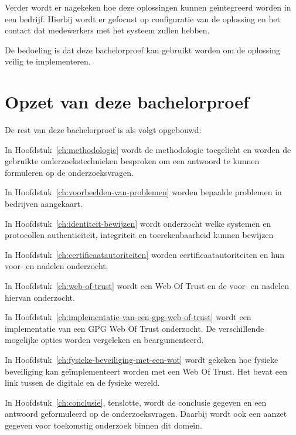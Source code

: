 Verder wordt er nagekeken hoe deze oplossingen kunnen geïntegreerd worden in een
bedrijf. Hierbij wordt er gefocust op configuratie van de oplossing en het
contact dat medewerkers met het systeem zullen hebben.

De bedoeling is dat deze bachelorproef kan gebruikt worden om de oplossing
veilig te implementeren.

\section{Opzet van deze bachelorproef}
\label{sec:opzet-bachelorproef}


De rest van deze bachelorproef is als volgt opgebouwd:

In Hoofdstuk~\ref{ch:methodologie} wordt de methodologie toegelicht en worden de
gebruikte onderzoekstechnieken besproken om een antwoord te kunnen formuleren op
de onderzoeksvragen.

In Hoofdstuk~\ref{ch:voorbeelden-van-problemen} worden bepaalde problemen in
bedrijven aangekaart.

In Hoofdstuk~\ref{ch:identiteit-bewijzen} wordt onderzocht welke systemen en
protocollen \gls{authenticiteit}, \gls{integriteit} en \gls{toerekenbaarheid}
kunnen bewijzen

In Hoofdstuk~\ref{ch:certificaatautoriteiten} worden certificaatautoriteiten en
hun
voor- en nadelen onderzocht.

In Hoofdstuk~\ref{ch:web-of-trust} wordt een Web Of Trust en de voor- en
nadelen hiervan onderzocht.

In Hoofdstuk~\ref{ch:implementatie-van-een-gpg-web-of-trust} wordt een
implementatie van een \gls{GPG} Web Of Trust onderzocht. De verschillende mogelijke
opties worden vergeleken en beargumenteerd.

In Hoofdstuk~\ref{ch:fysieke-beveiliging-met-een-wot} wordt gekeken hoe fysieke
beveiliging kan geïmplementeert worden met een Web Of Trust. Het bevat een link
tussen de digitale en de fysieke wereld.

In Hoofdstuk~\ref{ch:conclusie}, tenslotte, wordt de conclusie gegeven en een
antwoord geformuleerd op de onderzoeksvragen. Daarbij wordt ook een aanzet
gegeven voor toekomstig onderzoek binnen dit domein.
